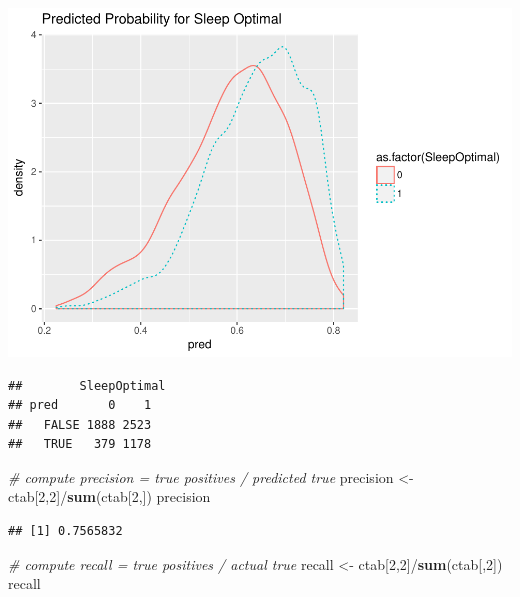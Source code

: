 \documentclass[]{article}
\newenvironment{Shaded}{\begin{snugshade}}{\end{snugshade}}
\newcommand{\KeywordTok}[1]{\textcolor[rgb]{0.13,0.29,0.53}{\textbf{{#1}}}}
\newcommand{\DataTypeTok}[1]{\textcolor[rgb]{0.13,0.29,0.53}{{#1}}}
\newcommand{\DecValTok}[1]{\textcolor[rgb]{0.00,0.00,0.81}{{#1}}}
\newcommand{\FloatTok}[1]{\textcolor[rgb]{0.00,0.00,0.81}{{#1}}}
\newcommand{\StringTok}[1]{\textcolor[rgb]{0.31,0.60,0.02}{{#1}}}
\newcommand{\CommentTok}[1]{\textcolor[rgb]{0.56,0.35,0.01}{\textit{{#1}}}}
\newcommand{\NormalTok}[1]{{#1}}
\begin{document}
\includegraphics{Hmwk7AnswerKey_files/figure-latex/unnamed-chunk-17-1.pdf}

\begin{Shaded}
\end{Shaded}

\begin{verbatim}
##        SleepOptimal
## pred       0    1
##   FALSE 1888 2523
##   TRUE   379 1178
\end{verbatim}

\begin{Shaded}
\begin{Highlighting}[]
\CommentTok{# compute precision = true positives / predicted true}
\NormalTok{precision <-}\StringTok{ }\NormalTok{ctab[}\DecValTok{2}\NormalTok{,}\DecValTok{2}\NormalTok{]/}\KeywordTok{sum}\NormalTok{(ctab[}\DecValTok{2}\NormalTok{,])}
\NormalTok{precision}
\end{Highlighting}
\end{Shaded}

\begin{verbatim}
## [1] 0.7565832
\end{verbatim}

\begin{Shaded}
\begin{Highlighting}[]
\CommentTok{# compute recall = true positives / actual true}
\NormalTok{recall <-}\StringTok{ }\NormalTok{ctab[}\DecValTok{2}\NormalTok{,}\DecValTok{2}\NormalTok{]/}\KeywordTok{sum}\NormalTok{(ctab[,}\DecValTok{2}\NormalTok{])}
\NormalTok{recall}
\end{Highlighting}
\end{Shaded}
\end{document}
